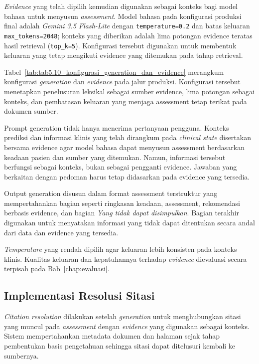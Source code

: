 \textit{Evidence} yang telah dipilih kemudian digunakan sebagai konteks bagi model bahasa untuk menyusun \textit{assessment}. Model bahasa pada konfigurasi produksi final adalah
\textit{Gemini 3.5 Flash-Lite} dengan \texttt{temperature=0.2} dan batas keluaran \texttt{max\_tokens=2048}; konteks yang diberikan adalah lima potongan
evidence teratas hasil retrieval (\texttt{top\_k=5}). Konfigurasi tersebut digunakan untuk membentuk keluaran yang tetap mengikuti evidence yang ditemukan
pada tahap retrieval.



Tabel~\ref{tab:tab5.10_konfigurasi_generation_dan_evidence} merangkum konfigurasi \textit{generation} dan \textit{evidence} pada jalur produksi. Konfigurasi tersebut menetapkan
penelusuran leksikal sebagai sumber evidence, lima potongan sebagai konteks, dan pembatasan keluaran yang menjaga assessment tetap terikat pada dokumen sumber.

Prompt generation tidak hanya menerima pertanyaan pengguna. Konteks prediksi dan informasi klinis yang telah dirangkum pada \textit{clinical state} disertakan bersama
evidence agar model bahasa dapat menyusun assessment berdasarkan keadaan pasien dan sumber yang ditemukan. Namun, informasi tersebut berfungsi sebagai konteks,
bukan sebagai pengganti evidence. Jawaban yang berkaitan dengan pedoman harus tetap didasarkan pada evidence yang tersedia.

Output generation disusun dalam format assessment terstruktur yang mempertahankan bagian seperti ringkasan keadaan, assessment, rekomendasi berbasis evidence, dan bagian
\textit{Yang tidak dapat disimpulkan}. Bagian terakhir digunakan untuk menyatakan informasi yang tidak dapat ditentukan secara andal dari data dan evidence yang tersedia.

\textit{Temperature} yang rendah dipilih agar keluaran lebih konsisten pada konteks klinis. Kualitas keluaran dan kepatuhannya terhadap \textit{evidence} dievaluasi
secara terpisah pada Bab~\ref{chap:evaluasi}.

\subsection{Implementasi Resolusi Sitasi}
\label{subsec:bab5-citation-resolution}

\textit{Citation resolution} dilakukan setelah \textit{generation} untuk menghubungkan sitasi yang muncul pada \textit{assessment} dengan \textit{evidence} yang
digunakan sebagai konteks. Sistem mempertahankan metadata dokumen dan halaman sejak tahap pembentukan basis pengetahuan sehingga sitasi dapat ditelusuri kembali ke
sumbernya.

